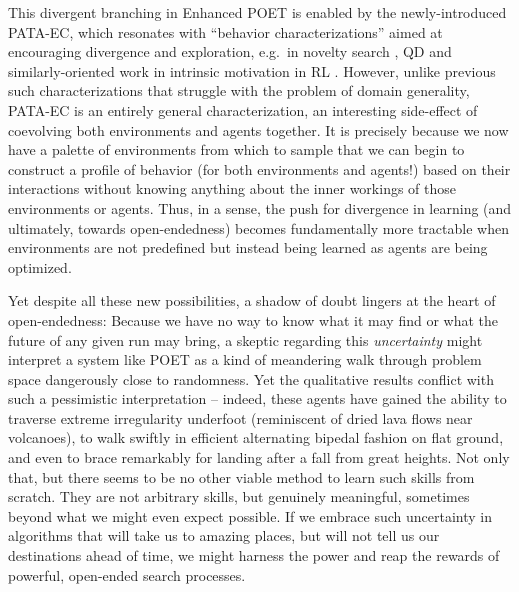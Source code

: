\documentclass{article}
\begin{document}
This divergent branching in Enhanced POET is enabled by the newly-introduced PATA-EC, which resonates with ``behavior characterizations'' aimed at encouraging divergence and exploration, e.g.\ in novelty search \cite{lehman2011abandoning}, QD \cite{pugh:frontiers16} and similarly-oriented work in intrinsic motivation in RL \cite{oudeyer2009intrinsic,schmidhuber2010formal,bellemare2016unifying}. 
However, unlike previous such characterizations that struggle with the problem of domain generality, PATA-EC is an entirely general characterization, an interesting side-effect of coevolving both environments and agents together. It is precisely because we now have a palette of environments from which to sample that we can begin to construct a profile of behavior (for both environments and agents!) based on their interactions without knowing anything about the inner workings of those environments or agents.  Thus, in a sense, the push for divergence in learning (and ultimately, towards open-endedness) becomes fundamentally more tractable when environments are not predefined but instead being learned as agents are being optimized.

Yet despite all these new possibilities, a shadow of doubt lingers at the heart of open-endedness: Because we have no way to know what it may find or what the future of any given run may bring, a skeptic regarding this \emph{uncertainty} might interpret a system like POET as a kind of meandering walk through problem space dangerously close to randomness. Yet the qualitative results conflict with such a pessimistic interpretation -- indeed, these agents have gained the ability to traverse extreme irregularity underfoot (reminiscent of dried lava flows near volcanoes), to walk swiftly in efficient alternating bipedal fashion on flat ground, and even to brace remarkably for landing after a fall from great heights. Not only that, but there seems to be no other viable method to learn such skills from scratch. They are not arbitrary skills, but genuinely meaningful, sometimes beyond what we might even expect possible. If we embrace such uncertainty in algorithms that will take us to amazing places, but will not tell us our destinations ahead of time, we might harness the power and reap the rewards of powerful, open-ended search processes.  
\end{document}
